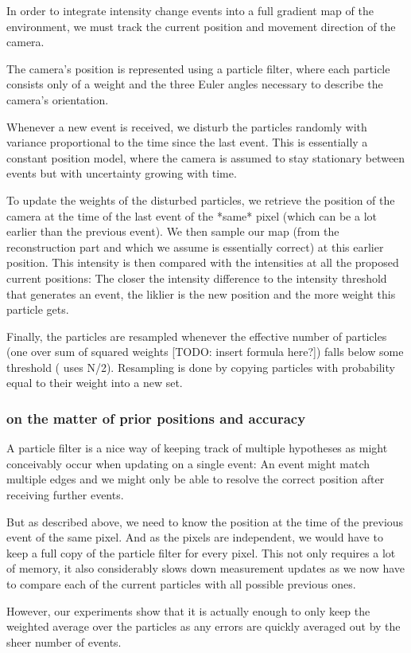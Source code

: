 In order to integrate intensity change events into a full gradient map of the
environment, we must track the current position and movement direction of the
camera.

The camera's position is represented using a particle filter, where each
particle consists only of a weight and the three Euler angles necessary to
describe the camera's orientation.

Whenever a new event is received, we disturb the particles randomly with
variance proportional to the time since the last event. This is essentially a
constant position model, where the camera is assumed to stay stationary between
events but with uncertainty growing with time.

To update the weights of the disturbed particles, we retrieve the position of
the camera at the time of the last event of the *same* pixel (which can be a
lot earlier than the previous event). We then sample our map (from the
reconstruction part and which we assume is essentially correct) at this earlier
position. This intensity is then compared with the intensities at all the
proposed current positions: The closer the intensity difference to the
intensity threshold that generates an event, the liklier is the new position
and the more weight this particle gets.

Finally, the particles are resampled whenever the effective number of particles
(one over sum of squared weights [TODO: insert formula here?]) falls below some
threshold (\cite{kim2014simultaneous} uses N/2). Resampling is done by copying
particles with probability equal to their weight into a new set.

\subsubsection{on the matter of prior positions and accuracy}

A particle filter is a nice way of keeping track of multiple hypotheses as
might conceivably occur when updating on a single event: An event might match
multiple edges and we might only be able to resolve the correct position after
receiving further events.

But as described above, we need to know the position at the time of the
previous event of the same pixel. And as the pixels are independent, we would
have to keep a full copy of the particle filter for every pixel. This not only
requires a lot of memory, it also considerably slows down measurement updates
as we now have to compare each of the current particles with all possible
previous ones.

However, our experiments show that it is actually enough to only keep the
weighted average over the particles as any errors are quickly averaged out by
the sheer number of events.
